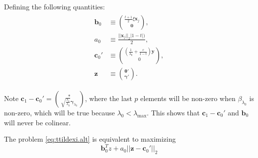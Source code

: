 Defining the following quantities:
\begin{gather}
    \begin{aligned}
        \boldsymbol b_0&\equiv\binom{\frac{t+1}{2}\xi \boldsymbol x_j}{\boldsymbol 0},\\
        a_0&\equiv\frac{||\boldsymbol x_j||_2|1-t|)}{2},\\
        \boldsymbol c_0'&\equiv\binom{\left(\frac{1}{\lambda_0}+\frac{c}{1-t}\right)\boldsymbol y}{0},\\
        \boldsymbol z &\equiv \binom{\boldsymbol\theta'}{\boldsymbol\gamma'}.
    \end{aligned}
\end{gather}

Note $\boldsymbol c_1-\boldsymbol c_0'=\binom{*}{\sqrt{\frac{\lambda_1}{\lambda_0}}\boldsymbol\gamma_{\lambda_0}}$, where the last $p$ elements will be non-zero when $\beta_{\lambda_0}$ is non-zero, which will be true because $\lambda_0<\lambda_{\max}$. This shows that $\boldsymbol c_1-\boldsymbol c_0'$ and $\boldsymbol b_0$ will never be colinear.

The problem \eqref{eq:ttildexi.alt} is equivalent to maximizing
\begin{equation}
    \label{eq:2.2.1}
    \boldsymbol b_0^Tz+a_0||\boldsymbol z-\boldsymbol c_0'||_2
\end{equation}

